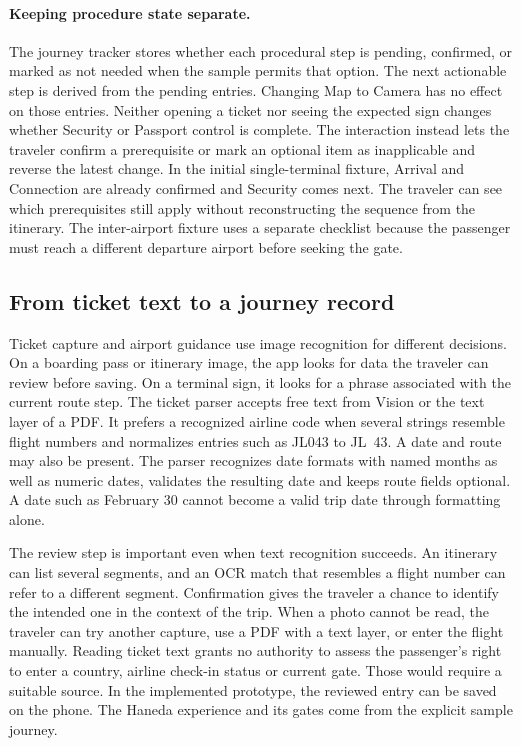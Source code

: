\documentclass[sigconf,nonacm,balance=false]{acmart}
\begin{document}
\paragraph{Keeping procedure state separate.} The journey tracker stores whether each procedural step is pending, confirmed, or marked as not needed when the sample permits that option. The next actionable step is derived from the pending entries. Changing Map to Camera has no effect on those entries. Neither opening a ticket nor seeing the expected sign changes whether Security or Passport control is complete. The interaction instead lets the traveler confirm a prerequisite or mark an optional item as inapplicable and reverse the latest change. In the initial single-terminal fixture, Arrival and Connection are already confirmed and Security comes next. The traveler can see which prerequisites still apply without reconstructing the sequence from the itinerary. The inter-airport fixture uses a separate checklist because the passenger must reach a different departure airport before seeking the gate.

\subsection{From ticket text to a journey record}
Ticket capture and airport guidance use image recognition for different decisions. On a boarding pass or itinerary image, the app looks for data the traveler can review before saving. On a terminal sign, it looks for a phrase associated with the current route step. The ticket parser accepts free text from Vision or the text layer of a PDF. It prefers a recognized airline code when several strings resemble flight numbers and normalizes entries such as JL043 to JL~43. A date and route may also be present. The parser recognizes date formats with named months as well as numeric dates, validates the resulting date and keeps route fields optional. A date such as February 30 cannot become a valid trip date through formatting alone.

The review step is important even when text recognition succeeds. An itinerary can list several segments, and an OCR match that resembles a flight number can refer to a different segment. Confirmation gives the traveler a chance to identify the intended one in the context of the trip. When a photo cannot be read, the traveler can try another capture, use a PDF with a text layer, or enter the flight manually. Reading ticket text grants no authority to assess the passenger's right to enter a country, airline check-in status or current gate. Those would require a suitable source. In the implemented prototype, the reviewed entry can be saved on the phone. The Haneda experience and its gates come from the explicit sample journey.
\end{document}

